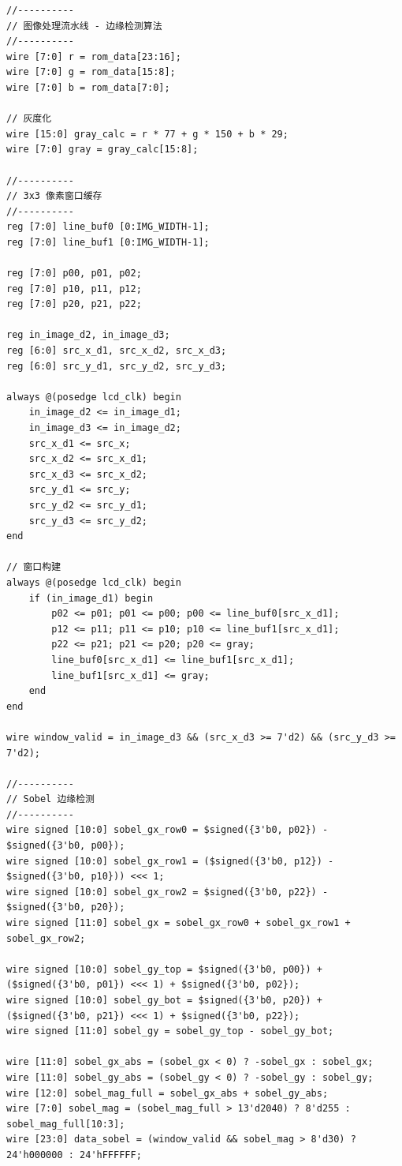 \documentclass[12pt,hyperref,a4paper,UTF8]{ctexart}
\begin{document}
\begin{lstlisting}[caption={lcd\_display.v完整代码}]
//----------
// 图像处理流水线 - 边缘检测算法
//----------
wire [7:0] r = rom_data[23:16];
wire [7:0] g = rom_data[15:8];
wire [7:0] b = rom_data[7:0];

// 灰度化
wire [15:0] gray_calc = r * 77 + g * 150 + b * 29;
wire [7:0] gray = gray_calc[15:8];

//----------
// 3x3 像素窗口缓存
//----------
reg [7:0] line_buf0 [0:IMG_WIDTH-1];
reg [7:0] line_buf1 [0:IMG_WIDTH-1];

reg [7:0] p00, p01, p02;
reg [7:0] p10, p11, p12;
reg [7:0] p20, p21, p22;

reg in_image_d2, in_image_d3;
reg [6:0] src_x_d1, src_x_d2, src_x_d3;
reg [6:0] src_y_d1, src_y_d2, src_y_d3;

always @(posedge lcd_clk) begin
    in_image_d2 <= in_image_d1;
    in_image_d3 <= in_image_d2;
    src_x_d1 <= src_x;
    src_x_d2 <= src_x_d1;
    src_x_d3 <= src_x_d2;
    src_y_d1 <= src_y;
    src_y_d2 <= src_y_d1;
    src_y_d3 <= src_y_d2;
end

// 窗口构建
always @(posedge lcd_clk) begin
    if (in_image_d1) begin
        p02 <= p01; p01 <= p00; p00 <= line_buf0[src_x_d1];
        p12 <= p11; p11 <= p10; p10 <= line_buf1[src_x_d1];
        p22 <= p21; p21 <= p20; p20 <= gray;
        line_buf0[src_x_d1] <= line_buf1[src_x_d1];
        line_buf1[src_x_d1] <= gray;
    end
end

wire window_valid = in_image_d3 && (src_x_d3 >= 7'd2) && (src_y_d3 >= 7'd2);

//----------
// Sobel 边缘检测
//----------
wire signed [10:0] sobel_gx_row0 = $signed({3'b0, p02}) - $signed({3'b0, p00});
wire signed [10:0] sobel_gx_row1 = ($signed({3'b0, p12}) - $signed({3'b0, p10})) <<< 1;
wire signed [10:0] sobel_gx_row2 = $signed({3'b0, p22}) - $signed({3'b0, p20});
wire signed [11:0] sobel_gx = sobel_gx_row0 + sobel_gx_row1 + sobel_gx_row2;

wire signed [10:0] sobel_gy_top = $signed({3'b0, p00}) + ($signed({3'b0, p01}) <<< 1) + $signed({3'b0, p02});
wire signed [10:0] sobel_gy_bot = $signed({3'b0, p20}) + ($signed({3'b0, p21}) <<< 1) + $signed({3'b0, p22});
wire signed [11:0] sobel_gy = sobel_gy_top - sobel_gy_bot;

wire [11:0] sobel_gx_abs = (sobel_gx < 0) ? -sobel_gx : sobel_gx;
wire [11:0] sobel_gy_abs = (sobel_gy < 0) ? -sobel_gy : sobel_gy;
wire [12:0] sobel_mag_full = sobel_gx_abs + sobel_gy_abs;
wire [7:0] sobel_mag = (sobel_mag_full > 13'd2040) ? 8'd255 : sobel_mag_full[10:3];
wire [23:0] data_sobel = (window_valid && sobel_mag > 8'd30) ? 24'h000000 : 24'hFFFFFF;


\end{lstlisting}
\end{document}
